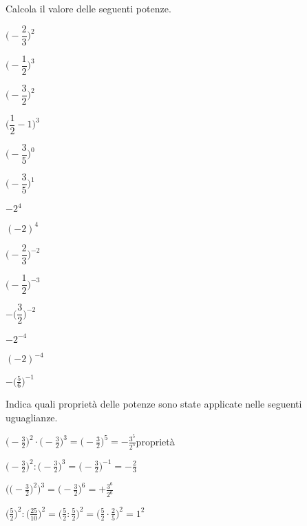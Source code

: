 
\begin{esercizio}
 \label{ese:3.56}
Calcola il valore delle seguenti potenze.
\begin{multicols}{4}
\begin{enumeratea}
\spazielenx
 \item \(\bigg(-\dfrac{2}{3}\bigg)^2\)
 \item \(\bigg(-\dfrac{1}{2}\bigg)^3\)
 \item \(\bigg(-\dfrac{3}{2}\bigg)^2\)
 \item \(\bigg(\dfrac{1}{2}-1\bigg)^3\)
 \item \(\bigg(-\dfrac{3}{5}\bigg)^0\)
 \item \(\bigg(-\dfrac{3}{5}\bigg)^1\)
 \item \(-2^4\)
 \item \((-2)^4\)
 \item \(\bigg(-\dfrac{2}{3}\bigg)^{-2}\)
 \item \(\bigg(-\dfrac{1}{2}\bigg)^{-3}\)
 \item \(-\bigg(\dfrac{3}{2}\bigg)^{-2}\)
 \item \(-2^{-4}\)
 \item \((-2)^{-4}\)
 \item \(-\bigg(\frac{5}{6}\bigg)^{-1}\)
\end{enumeratea}
\end{multicols}
\end{esercizio}

\begin{esercizio}
 \label{ese:3.57}
Indica quali proprietà delle potenze sono state applicate nelle seguenti 
uguaglianze.
\begin{enumeratea}
\spazielenx
 \item \(\displaystyle{\bigg(-\frac{3}{2}\bigg)^2\cdot\bigg(-\frac{3}{2}
 \bigg)^{3}=%
\bigg(-\frac{3}{2}\bigg)^{5}=-\frac{3^5}{2^5}}\)\qquad proprietà \
 \item \(\displaystyle{\bigg(-\frac{3}{2}\bigg)^2:\bigg(-\frac{3}{2}\bigg)^{3}=
 \bigg(-\frac{3}{2}\bigg)^{-1}=%
-\frac{2}{3}}\)
 \item \(\displaystyle{\bigg(\bigg(-\frac{3}{2}\bigg)^2\bigg)^3=
 \bigg(-\frac{3}{2}\bigg)^{6}=%
+\frac{3^6}{2^6}}\)
 \item \(\displaystyle{\bigg(\frac{5}{2}\bigg)^2:\bigg(\frac{25}{10}\bigg)^2=
 \bigg(\frac{5}{2}:\frac{5}{2}\bigg)^2=%
\bigg(\frac{5}{2}\cdot\frac{2}{5}\bigg)^2=1^2}\)
\end{enumeratea}
\end{esercizio}


